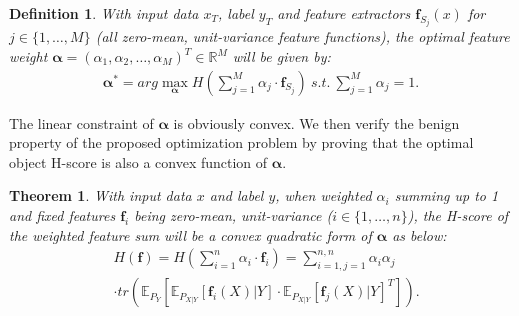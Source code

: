 \documentclass[letterpaper]{article} %
\newtheorem{theorem}{Theorem}
\newtheorem{definition}{Definition}
\begin{document}
\begin{definition}
    With input data $x_T$, label $y_T$ and feature extractors $\boldsymbol{f}_{S_j}(x)$ for $j \in \{1, \dots, M\}$ (all zero-mean, unit-variance feature functions), the optimal feature weight $\boldsymbol{\alpha} = (\alpha_1, \alpha_2, \dots, \alpha_M)^T \in \mathbb{R}^M$
    will be given by:
    \begin{equation}
        \begin{aligned}
        \boldsymbol{\alpha}^* = arg\max_{\boldsymbol{\alpha}}  H\left(\sum_{j=1}^M \alpha_{j} \cdot \boldsymbol{f}_{S_j}\right)  \ 
        s.t.\ \sum_{j=1}^M \alpha_j = 1 .
        \end{aligned}
    \label{tscore}    
    \end{equation}
 \label{def:tscore}
\end{definition}

The linear constraint of $\boldsymbol{\alpha}$ is obviously convex. We then verify the benign property of the proposed optimization problem by proving that the optimal object H-score is also a convex function of $\boldsymbol{\alpha}$.


\begin{theorem}
      With input data $x$ and label $y$, when weighted $\alpha_i$ summing up to 1 and fixed features $\boldsymbol{f}_i$ being zero-mean, unit-variance ($i \in \{1, \dots, n\}$), the H-score of the weighted feature sum will be a convex quadratic form of $\boldsymbol{\alpha}$ as below:
    \begin{equation}
    \begin{aligned}
     &H(\boldsymbol{f}) = H\left(\sum_{i=1}^n \alpha_i \cdot \boldsymbol{f}_i\right) = \sum_{i=1, j=1}^{n,n}\alpha_i \alpha_j \\
     &\cdot tr(\mathbb{E}_{P_{Y}}[\mathbb{E}_{P_{X|Y}}[\boldsymbol{f}_i(X)|Y]\cdot \mathbb{E}_{P_{X|Y}}[\boldsymbol{f}_j(X)|Y]^T])   .
    \end{aligned}
    \end{equation}
    \label{theo:convex}
\end{theorem}
\end{document}
